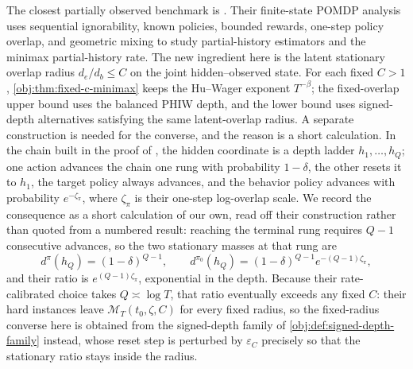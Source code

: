 \documentclass[11pt]{article}
\begin{document}
The closest partially observed benchmark is \citet[Model 3 and Theorems 2.1, 3.1]{HuWager2023}. Their finite-state POMDP analysis uses sequential ignorability, known policies, bounded rewards, one-step policy overlap, and geometric mixing to study partial-history estimators and the minimax partial-history rate. The new ingredient here is the latent stationary overlap radius \(d_e/d_b\le C\) on the joint hidden--observed state. For each fixed \(C>1\), \cref{obj:thm:fixed-c-minimax} keeps the Hu--Wager exponent \(T^{-\beta}\); the fixed-overlap upper bound uses the balanced PHIW depth, and the lower bound uses signed-depth alternatives satisfying the same latent-overlap radius. A separate construction is needed for the converse, and the reason is a short calculation. In the chain built in the proof of \citet[Theorem 3.1]{HuWager2023}, the hidden coordinate is a depth ladder \(h_1,\ldots,h_Q\); one action advances the chain one rung with probability \(1-\delta\), the other resets it to \(h_1\), the target policy always advances, and the behavior policy advances with probability \(e^{-\zeta_\pi}\), where \(\zeta_\pi\) is their one-step log-overlap scale. We record the consequence as a short calculation of our own, read off their construction rather than quoted from a numbered result: reaching the terminal rung requires \(Q-1\) consecutive advances, so the two stationary masses at that rung are
\[
d^{\pi}(h_Q)=(1-\delta)^{Q-1},
\qquad
d^{\pi_0}(h_Q)=(1-\delta)^{Q-1}e^{-(Q-1)\zeta_\pi},
\]
and their ratio is \(e^{(Q-1)\zeta_\pi}\), exponential in the depth. Because their rate-calibrated choice takes \(Q\asymp\log T\), that ratio eventually exceeds any fixed \(C\): their hard instances leave \(\mathcal M_T(t_0,\zeta,C)\) for every fixed radius, so the fixed-radius converse here is obtained from the signed-depth family of \cref{obj:def:signed-depth-family} instead, whose reset step is perturbed by \(\varepsilon_C\) precisely so that the stationary ratio stays inside the radius.
\end{document}
